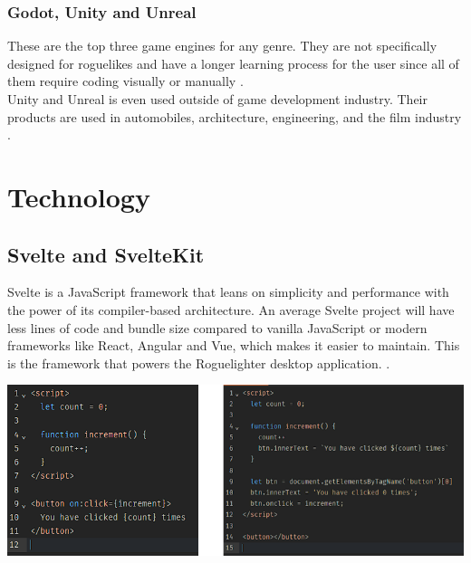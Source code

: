 \documentclass{article}
\begin{document}
\subsubsection{Godot, Unity and Unreal}
These are the top three game engines for any genre. They are not specifically designed for roguelikes and have a longer learning process for the user since all of them require coding visually or manually \cite{godot}\cite{unity}\cite{unreal}.\\

Unity and Unreal is even used outside of game development industry. Their products are used in automobiles, architecture, engineering, and the film industry \cite{unity}\cite{unity-industry}\cite{unreal}.
 
\section{Technology}\label{technology}
\subsection{Svelte and SvelteKit}
Svelte is a JavaScript framework that leans on simplicity and performance with the power of its compiler-based architecture. An average Svelte project will have less lines of code and bundle size compared to vanilla JavaScript or modern frameworks like React, Angular and Vue, which makes it easier to maintain. This is the framework that powers the Roguelighter desktop application. \cite{svelte-less}.\\

\begin{minipage}{\linewidth}
    \centering
    \includegraphics[width=1\textwidth]{svelte-vs-vanilla.png}
\end{minipage}\\\\
\end{document}
